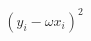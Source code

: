 \documentclass[preview]{standalone}
\begin{document}
\begin{align*}
(y_i- \omega x_i)^2
\end{align*}
\end{document}
